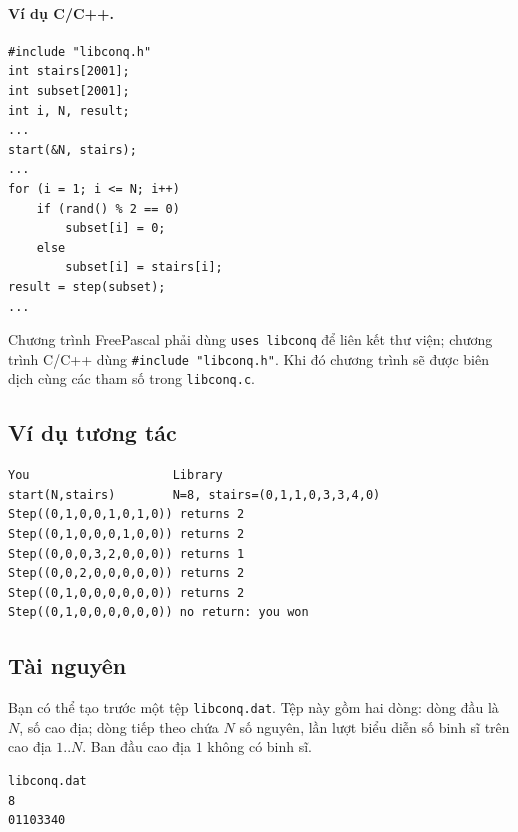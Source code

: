 \documentclass[11pt]{article}
\begin{document}
\paragraph{Ví dụ C/C++.}
\begin{verbatim}
#include "libconq.h"
int stairs[2001];
int subset[2001];
int i, N, result;
...
start(&N, stairs);
...
for (i = 1; i <= N; i++)
    if (rand() % 2 == 0)
        subset[i] = 0;
    else
        subset[i] = stairs[i];
result = step(subset);
...
\end{verbatim}

Chương trình FreePascal phải dùng \texttt{uses libconq} để liên kết thư viện;
chương trình C/C++ dùng \texttt{\#include "libconq.h"}. Khi đó chương trình sẽ
được biên dịch cùng các tham số trong \texttt{libconq.c}.

\subsection*{Ví dụ tương tác}

\begin{verbatim}
You                    Library
start(N,stairs)        N=8, stairs=(0,1,1,0,3,3,4,0)
Step((0,1,0,0,1,0,1,0)) returns 2
Step((0,1,0,0,0,1,0,0)) returns 2
Step((0,0,0,3,2,0,0,0)) returns 1
Step((0,0,2,0,0,0,0,0)) returns 2
Step((0,1,0,0,0,0,0,0)) returns 2
Step((0,1,0,0,0,0,0,0)) no return: you won
\end{verbatim}

\subsection*{Tài nguyên}

Bạn có thể tạo trước một tệp \texttt{libconq.dat}. Tệp này gồm hai dòng: dòng
đầu là \(N\), số cao địa; dòng tiếp theo chứa \(N\) số nguyên, lần lượt biểu
diễn số binh sĩ trên cao địa \(1..N\). Ban đầu cao địa \(1\) không có binh sĩ.

\begin{verbatim}
libconq.dat
8
01103340
\end{verbatim}
\end{document}
